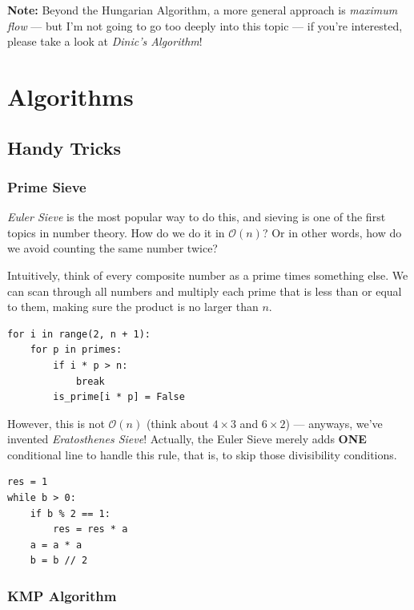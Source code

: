 \documentclass{article}
\begin{document}
\textbf{Note:} Beyond the Hungarian Algorithm, a more general approach is \emph{maximum flow} --- but I'm not going to go too deeply into this topic --- if you're interested, please take a look at \emph{Dinic's Algorithm}!




\newpage

\section{Algorithms}

\subsection{Handy Tricks}

\subsubsection{Prime Sieve}

\emph{Euler Sieve} is the most popular way to do this, and sieving is one of the first topics in number theory. How do we do it in $\mathcal O(n)$? Or in other words, how do we avoid counting the same number twice?

Intuitively, think of every composite number as a prime times something else. We can scan through all numbers and multiply each prime that is less than or equal to them, making sure the product is no larger than $n$.

\begin{lstlisting}[style=python]
for i in range(2, n + 1):
    for p in primes:
        if i * p > n:
            break
        is_prime[i * p] = False
\end{lstlisting}

However, this is not $\mathcal O(n)$ (think about $4\times3$ and $6\times2$) --- anyways, we've invented \emph{Eratosthenes Sieve}! Actually, the Euler Sieve merely adds \textbf{ONE} conditional line to handle this rule, that is, to skip those divisibility conditions.

\begin{lstlisting}[style=python]
res = 1
while b > 0:
    if b % 2 == 1:
        res = res * a
    a = a * a
    b = b // 2
\end{lstlisting}

\subsubsection{KMP Algorithm}
\end{document}
